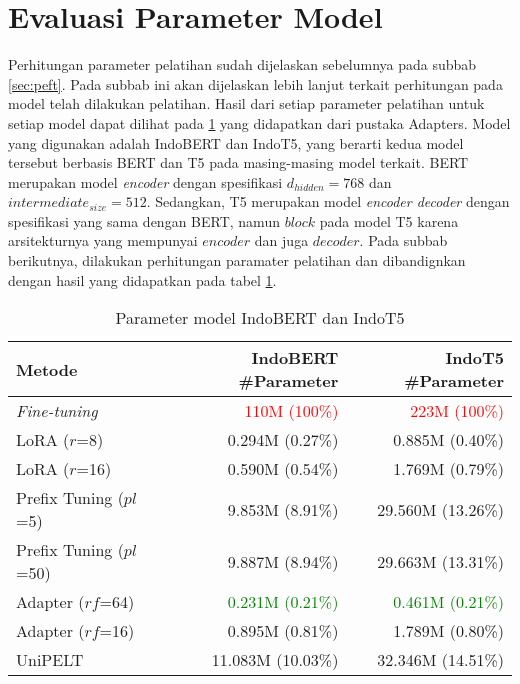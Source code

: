 \section{Evaluasi Parameter Model}

Perhitungan parameter pelatihan sudah dijelaskan sebelumnya pada subbab \ref{sec:peft}. Pada subbab ini akan dijelaskan lebih lanjut terkait perhitungan pada model telah dilakukan pelatihan. Hasil dari setiap parameter pelatihan untuk setiap model dapat dilihat pada \ref{table:param-model} yang didapatkan dari pustaka Adapters. Model yang digunakan adalah IndoBERT dan IndoT5, yang berarti kedua model tersebut berbasis BERT dan T5 pada masing-masing model terkait. BERT merupakan model \textit{encoder} dengan spesifikasi $d_{hidden} = 768$ dan $intermediate_{size} = 512$. Sedangkan, T5 merupakan model \textit{encoder decoder} dengan spesifikasi yang sama dengan BERT, namun $block$ pada model T5 karena arsitekturnya yang mempunyai $encoder$ dan juga $decoder$. Pada subbab berikutnya, dilakukan perhitungan paramater pelatihan dan dibandignkan dengan hasil yang didapatkan pada tabel \ref{table:param-model}.

\begin{table}[h]
    \centering
    \caption{Parameter model IndoBERT dan IndoT5}
    \label{table:param-model}
    \begin{tabular}{l|r|r}
        \toprule
        \textbf{Metode} & \textbf{IndoBERT \#Parameter} & \textbf{IndoT5 \#Parameter} \\
        \midrule
        \textit{Fine-tuning} & \textcolor{Red}{110M (100\%)} & \textcolor{Red}{223M (100\%)} \\
        LoRA ($r$=8) & 0.294M (0.27\%) & 0.885M (0.40\%) \\
        LoRA ($r$=16) & 0.590M (0.54\%) & 1.769M (0.79\%) \\
        Prefix Tuning ($pl$=5) & 9.853M (8.91\%) & 29.560M (13.26\%) \\
        Prefix Tuning ($pl$=50) & 9.887M (8.94\%) & 29.663M (13.31\%) \\
        Adapter ($rf$=64) & \textcolor{Green}{0.231M (0.21\%)} & \textcolor{Green}{0.461M (0.21\%)} \\
        Adapter ($rf$=16) & 0.895M (0.81\%) & 1.789M (0.80\%) \\
        UniPELT & 11.083M (10.03\%) & 32.346M (14.51\%) \\
        \bottomrule
    \end{tabular}
\end{table}

